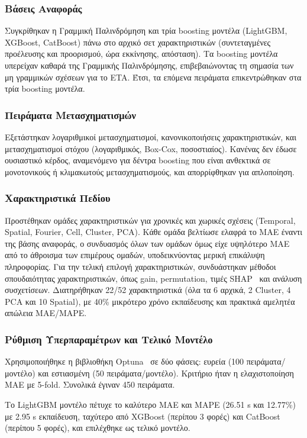 \subsubsection*{Βάσεις Αναφοράς}
Συγκρίθηκαν η Γραμμική Παλινδρόμηση και τρία boosting μοντέλα (LightGBM, XGBoost, CatBoost) πάνω στο αρχικό σετ χαρακτηριστικών (συντεταγμένες προέλευσης και προορισμού, ώρα εκκίνησης, απόσταση).
Τα boosting μοντέλα υπερείχαν καθαρά της Γραμμικής Παλινδρόμησης, επιβεβαιώνοντας τη σημασία των μη γραμμικών σχέσεων για το ETA.
Έτσι, τα επόμενα πειράματα επικεντρώθηκαν στα τρία boosting μοντέλα.

\subsubsection*{Πειράματα Μετασχηματισμών}
Εξετάστηκαν λογαριθμικοί μετασχηματισμοί, κανονικοποιήσεις χαρακτηριστικών, και μετασχηματισμοί στόχου (λογαριθμικός, Box-Cox, ποσοστιαίος).
Κανένας δεν έδωσε ουσιαστικό κέρδος, αναμενόμενο για δέντρα boosting που είναι ανθεκτικά σε μονοτονικούς ή κλιμακωτούς μετασχηματισμούς, και απορρίφθηκαν για απλοποίηση.

\subsubsection*{Χαρακτηριστικά Πεδίου}
Προστέθηκαν ομάδες χαρακτηριστικών για χρονικές και χωρικές σχέσεις (Temporal, Spatial, Fourier, Cell, Cluster, PCA).
Κάθε ομάδα βελτίωσε ελαφρά το MAE έναντι της βάσης αναφοράς, ο συνδυασμός όλων των ομάδων όμως είχε υψηλότερο MAE από το άθροισμα των επιμέρους ομαδών, υποδεικνύοντας μερική επικάλυψη πληροφορίας.
Για την τελική επιλογή χαρακτηριστικών, συνδυάστηκαν μέθοδοι σπουδαιότητας χαρακτηριστικών, όπως gain, permutation, τιμές SHAP~\cite{lundberg2017unified} και ανάλυση συσχετίσεων.
Διατηρήθηκαν 22/52 χαρακτηριστικά (όλα τα 6 αρχικά, 2 Cluster, 4 PCA και 10 Spatial), με 40\% μικρότερο χρόνο εκπαίδευσης και πρακτικά αμελητέα απώλεια MAE/MAPE.

\subsubsection*{Ρύθμιση Υπερπαραμέτρων και Τελικό Μοντέλο}
Χρησιμοποιήθηκε η βιβλιοθήκη Optuna~\cite{akiba2019optuna} σε δύο φάσεις: ευρεία (100 πειράματα/μοντέλο) και εστιασμένη (50 πειράματα/μοντέλο).
Κριτήριο ήταν η ελαχιστοποίηση MAE με 5-fold.
Συνολικά έγιναν 450 πειράματα.

Το LightGBM μοντέλο πέτυχε το καλύτερο MAE και MAPE (26.51 s και 12.77\%) με 2.95 s εκπαίδευση, ταχύτερο από XGBoost (περίπου 3 φορές) και CatBoost (περίπου 5 φορές), και επιλέχθηκε ως τελικό μοντέλο.

